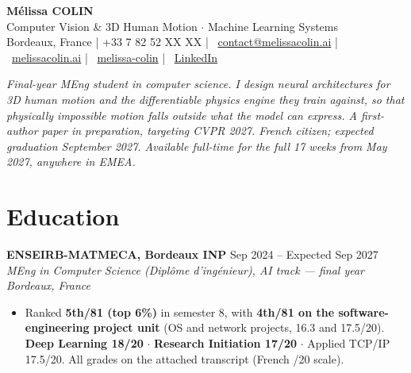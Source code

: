 \documentclass[10pt, letterpaper]{article}
\newcommand{\entry}[4]{%
  \noindent \textbf{#1} \hfill #2 \\
  \textit{#3} \hfill \textit{#4} \par
}
\providecommand{\myphone}{+33 7 82 52 XX XX}
\begin{document}
\begin{center}
    {\fontsize{19}{19}\selectfont \textbf{Mélissa COLIN}} \\[3pt]
    {\normalsize Computer Vision \& 3D Human Motion $\cdot$ Machine Learning Systems} \\[3pt]

    \small{
    \faMapMarker* Bordeaux, France \;|\;
    \faPhone* \myphone{} \;|\;
    \faEnvelope~\href{mailto:contact@melissacolin.ai}{contact@melissacolin.ai} \;|\;
    \faGlobe~\href{https://melissacolin.ai}{melissacolin.ai} \;|\;
    \faGithub~\href{https://github.com/melissa-colin}{melissa-colin} \;|\;
    \faLinkedin~\href{https://www.linkedin.com/in/melissacolin/}{LinkedIn}
    }
\end{center}

\vspace{1pt}

{\small \textit{Final-year MEng student in computer science. I design neural
architectures for 3D human motion and the differentiable physics engine they train against,
so that physically impossible motion falls outside what the model can express.
A first-author paper in preparation, targeting CVPR 2027. French citizen; expected graduation September 2027.
Available full-time for the full 17 weeks from May 2027, anywhere in EMEA.}}

\section{Education}

\entry{ENSEIRB-MATMECA, Bordeaux INP}{Sep 2024 -- Expected Sep 2027}%
{MEng in Computer Science (\textit{Diplôme d'ingénieur}), AI track --- final year}{Bordeaux, France}
\begin{itemize}
    \item Ranked \textbf{5th/81 (top 6\%)} in semester 8, with \textbf{4th/81 on the software-engineering project unit} (OS and network projects, 16.3 and 17.5/20). \textbf{Deep Learning 18/20} $\cdot$ \textbf{Research Initiation 17/20} $\cdot$ Applied TCP/IP 17.5/20. All grades on the attached transcript (French /20 scale).
\end{itemize}

\vspace{1pt}
\end{document}
